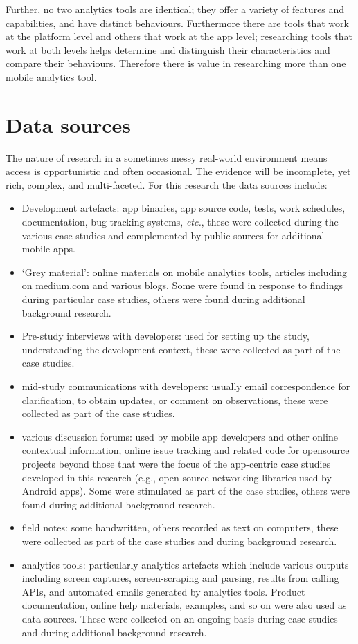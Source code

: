 Further, no two analytics tools are identical; they offer a variety of features and capabilities, and have distinct behaviours.  Furthermore there are tools that work at the platform level and others that work at the app level; researching tools that work at both levels helps determine and distinguish their characteristics and compare their behaviours. Therefore there is value in researching more than one mobile analytics tool.

\section{Data sources}
The nature of research in a sometimes messy real-world environment means access is opportunistic and often occasional. The evidence will be incomplete, yet rich, complex, and multi-faceted. For this research the data sources include:

\begin{itemize}
    \itemsep0em
    \item Development artefacts: app binaries, app source code, tests, work schedules, documentation, bug tracking systems, \textit{etc.}, these were collected during the various case studies and complemented by public sources for additional mobile apps.
    \item `Grey material': online materials on mobile analytics tools, articles including on medium.com and various blogs. Some were found in response to findings during particular case studies, others were found during additional background research.
    \item Pre-study interviews with developers: used for setting up the study, understanding the development context, these were collected as part of the case studies.
    \item mid-study communications with developers: usually email correspondence for clarification, to obtain updates, or comment on observations, these were collected as part of the case studies.
    \item various discussion forums: used by mobile app developers and other online contextual information, online issue tracking and related code for opensource projects beyond those that were the focus of the app-centric case studies developed in this research (e.g., open source networking libraries used by Android apps). Some were stimulated as part of the case studies, others were found during additional background research.
    \item field notes: some handwritten, others recorded as text on computers, these were collected as part of the case studies and during background research.
    \item analytics tools: particularly analytics artefacts which include various outputs including screen captures, screen-scraping and parsing, results from calling APIs, and automated emails generated by analytics tools. Product documentation, online help materials, examples, and so on were also used as data sources. These were collected on an ongoing basis during case studies and during additional background research.
\end{itemize}

